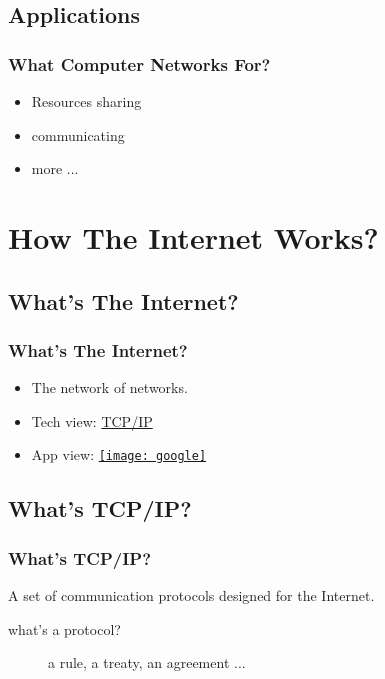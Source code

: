 \documentclass[hyperref={xetex,colorlinks,linkcolor=blue},green,compress]{beamer}
\newcommand\googlelogo{\texttt{[image: google]}}
\begin{document}
\subsection{Applications}
\label{sec:app}

\begin{frame}\frametitle{What Computer Networks For?}
\begin{itemize}
\item Resources sharing
\item communicating
\item more ...
\end{itemize}
\end{frame}

\section{How The Internet Works?}
\label{sec:principle}


\subsection[Definition]{What's The Internet?}
\label{sec:whatsinternet}

\begin{frame}\frametitle{What's The Internet?}
\begin{itemize}
\item The network of networks.
\item Tech view: \href{http://en.wikipedia.org/wiki/Tcp/ip}{TCP/IP}
\item App view: \href{http://en.wikipedia.org/wiki/Google}{\googlelogo}
\end{itemize}
\end{frame}

\subsection[TCP/IP]{What's TCP/IP?}
\label{sec:tcpip}

\begin{frame}\frametitle{What's TCP/IP?}
A set of communication protocols designed for the Internet.

\begin{description}
\item[what's a protocol?] a rule, a treaty, an agreement ...
\end{description}
\end{frame}
\end{document}
